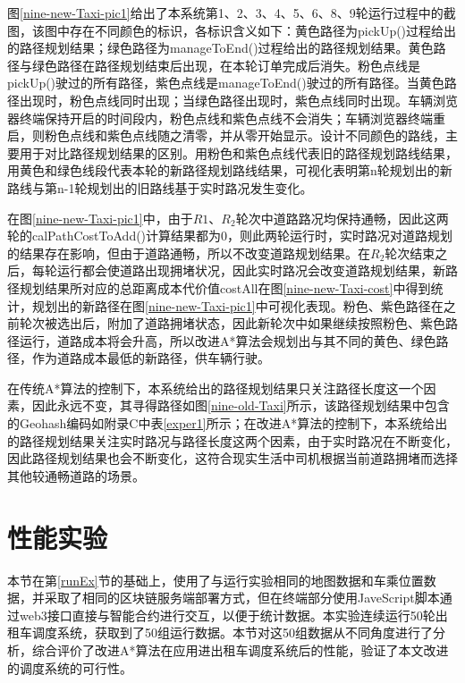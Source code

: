 图\ref{nine-new-Taxi-pic1}给出了本系统第1、2、3、4、5、6、8、9轮运行过程中的截图，该图中存在不同颜色的标识，各标识含义如下：黄色路径为pickUp()过程给出的路径规划结果；绿色路径为manageToEnd()过程给出的路径规划结果。黄色路径与绿色路径在路径规划结束后出现，在本轮订单完成后消失。粉色点线是pickUp()驶过的所有路径，紫色点线是manageToEnd()驶过的所有路径。当黄色路径出现时，粉色点线同时出现；当绿色路径出现时，紫色点线同时出现。车辆浏览器终端保持开启的时间段内，粉色点线和紫色点线不会消失；车辆浏览器终端重启，则粉色点线和紫色点线随之清零，并从零开始显示。设计不同颜色的路线，主要用于对比路径规划结果的区别。用粉色和紫色点线代表旧的路径规划路线结果，用黄色和绿色线段代表本轮的新路径规划路线结果，可视化表明第n轮规划出的新路线与第n-1轮规划出的旧路线基于实时路况发生变化。

在图\ref{nine-new-Taxi-pic1}中，由于$R1$、$R_2$轮次中道路路况均保持通畅，因此这两轮的calPathCostToAdd()计算结果都为0，则此两轮运行时，实时路况对道路规划的结果存在影响，但由于道路通畅，所以不改变道路规划结果。在$R_2$轮次结束之后，每轮运行都会使道路出现拥堵状况，因此实时路况会改变道路规划结果，新路径规划结果所对应的总距离成本代价值costAll在图\ref{nine-new-Taxi-cost}中得到统计，规划出的新路径在图\ref{nine-new-Taxi-pic1}中可视化表现。粉色、紫色路径在之前轮次被选出后，附加了道路拥堵状态，因此新轮次中如果继续按照粉色、紫色路径运行，道路成本将会升高，所以改进A*算法会规划出与其不同的黄色、绿色路径，作为道路成本最低的新路径，供车辆行驶。


在传统A*算法的控制下，本系统给出的路径规划结果只关注路径长度这一个因素，因此永远不变，其寻得路径如图\ref{nine-old-Taxi}所示，该路径规划结果中包含的Geohash编码如附录C中表\ref{exper1}所示；在改进A*算法的控制下，本系统给出的路径规划结果关注实时路况与路径长度这两个因素，由于实时路况在不断变化，因此路径规划结果也会不断变化，这符合现实生活中司机根据当前道路拥堵而选择其他较通畅道路的场景。

\section{性能实验}
本节在第\ref{runEx}节的基础上，使用了与运行实验相同的地图数据和车乘位置数据，并采取了相同的区块链服务端部署方式，但在终端部分使用JaveScript脚本通过web3接口直接与智能合约进行交互，以便于统计数据。本实验连续运行50轮出租车调度系统，获取到了50组运行数据。本节对这50组数据从不同角度进行了分析，综合评价了改进A*算法在应用进出租车调度系统后的性能，验证了本文改进的调度系统的可行性。

